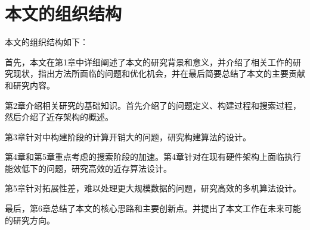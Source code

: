 


\section{本文的组织结构}
本文的组织结构如下：

首先，本文在第1章中详细阐述了本文的研究背景和意义，并介绍了相关工作的研究现状，指出\ganns 方法所面临的问题和优化机会，并在最后简要总结了本文的主要贡献和研究内容。

第2章介绍相关研究的基础知识。首先介绍了\ganns 的问题定义、构建过程和搜索过程，然后介绍了近存架构的概述。

第3章针对\ganns 中构建阶段的计算开销大的问题，研究构建算法的设计。

第4章和第5章重点考虑\ganns 的搜索阶段的加速。第4章针对\ganns 在现有硬件架构上面临执行能效低下的问题，研究高效的近存算法设计。

第5章针对\ganns 拓展性差，难以处理更大规模数据的问题，研究高效的多机算法设计。

最后，第6章总结了本文的核心思路和主要创新点。并提出了本文工作在未来可能的研究方向。